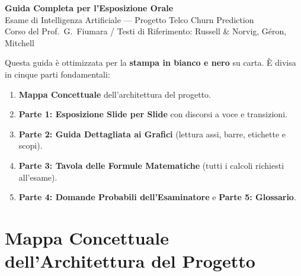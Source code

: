 \documentclass[11pt, a4paper]{article}
\begin{document}
\begin{center}
    {\Huge \bfseries Guida Completa per l'Esposizione Orale}\\[6pt]
    {\Large Esame di Intelligenza Artificiale --- Progetto Telco Churn Prediction}\\[4pt]
    {\small Corso del Prof.\ G.\ Fiumara / Testi di Riferimento: Russell \& Norvig, Géron, Mitchell}
\end{center}

\vspace{2mm}

\noindent Questa guida è ottimizzata per la \textbf{stampa in bianco e nero} su carta. È divisa in cinque parti fondamentali:
\begin{enumerate}
    \item \textbf{Mappa Concettuale} dell'architettura del progetto.
    \item \textbf{Parte 1: Esposizione Slide per Slide} con discorsi a voce e transizioni.
    \item \textbf{Parte 2: Guida Dettagliata ai Grafici} (lettura assi, barre, etichette e scopi).
    \item \textbf{Parte 3: Tavola delle Formule Matematiche} (tutti i calcoli richiesti all'esame).
    \item \textbf{Parte 4: Domande Probabili dell'Esaminatore} e \textbf{Parte 5: Glossario}.
\end{enumerate}

\vspace{3mm}

\section*{Mappa Concettuale dell'Architettura del Progetto}

\vspace{3mm}
\end{document}
